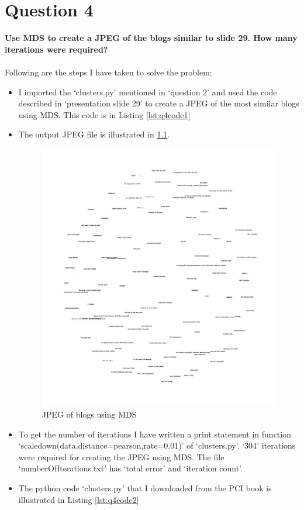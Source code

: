 \chapter{Question 4}
\label{available-representation}

\textbf{Use MDS to create a JPEG of the blogs similar to slide 29. How many iterations were required?}\\\\

Following are the steps I have taken to solve the problem:

\begin{itemize}
\item I imported the `clusters.py' mentioned in `question 2' and used the code described in `presentation slide 29' to create a JPEG of the most similar blogs using MDS. This code is in Listing \ref{lst:q4code1} 
\newpage
\item The output JPEG file is illustrated in \ref{fig:q4fig1}. 
\begin{figure}[h!]
\begin{center}
\hspace*{-3cm} 
\includegraphics[scale=0.55, keepaspectratio=true]{figures/blogs2d.jpg}
\caption{JPEG of blogs using MDS}
\label{fig:q4fig1}
\end{center}
\end{figure}
\item To get the number of iterations I have written a print statement in function `scaledown(data,distance=pearson,rate=0.01)' of `clusters.py'. `304'  iterations were required for creating the JPEG using MDS. The file `numberOfIterations.txt' has `total error' and `iteration count'.
\item The python code `clusters.py' that I downloaded from the PCI book is illustrated in Listing \ref{lst:q4code2}
\end{itemize}


